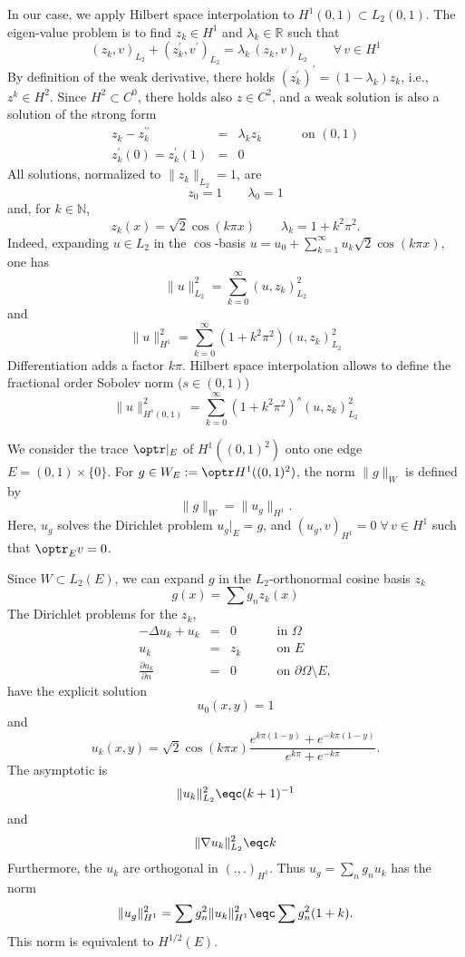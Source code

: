 In our case, we apply Hilbert space interpolation to $H^1(0,1) \subset L_2(0,1)$. The eigen-value problem is to find $z_k \in H^1$ and $\lambda_k \in {\mathbb R}$
such that
$$
(z_k, v)_{L_2} + (z_k^\prime, v^\prime)_{L_2} = \lambda_k \, 
        (z_k, v)_{L_2} \qquad \forall \, v \in H^1
$$
By definition of the weak derivative, there holds $(z_k^\prime)^\prime = (1-\lambda_k) z_k$, i.e., $z^k \in H^2$. Since $H^2 \subset C^0$, there holds also
$z \in C^2$, and a weak solution is also a solution of the strong form
\begin{equation}
\begin{array}{rcll}
z_k - z_k^{\prime \prime} & = & \lambda_k z_k \qquad & \mbox{ on } (0,1) \\
z_k^\prime(0) = z_k^\prime(1) & = & 0
\end{array}
\end{equation}
All solutions, normalized to $\| z_k \|_{L_2} = 1$, are
$$
z_0 = 1 \qquad \lambda_0 = 1
$$
and, for $k \in {\mathbb N}$,
$$
z_k(x) = \sqrt{2} \cos (k \pi x) \qquad \lambda_k = 1 + k^2 \pi^2.
$$
Indeed, expanding $u \in L_2$ in the $\cos$-basis $u = u_0 + \sum_{k=1}^\infty
u_k \sqrt2 \cos (k \pi x)$, one has
$$
\| u \|_{L_2}^2 = \sum_{k=0}^\infty (u, z_k)_{L_2}^2
$$
and
$$
\| u \|_{H^1}^2 = \sum_{k=0}^\infty (1+k^2 \pi^2) (u, z_k)_{L_2}^2
$$
Differentiation adds a factor $k \pi$.
Hilbert space interpolation allows to define the fractional order Sobolev
norm ($s \in (0,1)$)
$$
\| u \|_{H^s(0,1)}^2 = \sum_{k=0}^\infty (1+k^2 \pi^2)^s (u,z_k)_{L_2}^2
$$




\bigskip
We consider the trace $\optr|_E$ of $H^1((0,1)^2)$ onto one edge $E = (0,1) \times \{ 0 \}$. For $g \in W_E := \optr H^1((0,1)^2)$, the norm $\| g \|_W$ is 
defined by 
$$
\| g \|_W = \| u_g \|_{H^1}.
$$
Here, $u_g$ solves the Dirichlet problem $u_g|_E = g$, and $(u_g,v)_{H^1} = 0 \; \forall \, v \in H^1$ such that $\optr_E v = 0$.

Since $W \subset L_2(E)$, we can expand $g$ in the $L_2$-orthonormal cosine basis $z_k$
$$
g(x) = \sum g_n z_k(x)
$$
The Dirichlet problems for the $z_k$,
$$
\begin{array}{rcll}
-\Delta u_k + u_k & = & 0  \qquad & \mbox{in } \Omega \\
 u_k & = & z_k \qquad & \mbox{on } E \\
\frac{\partial u_k}{\partial n} & = & 0 \qquad & \mbox{on } \partial \Omega \setminus E,
\end{array}
$$
have the explicit solution
$$
u_0(x,y) = 1
$$
and
$$
u_k(x,y) = \sqrt 2 \cos (k \pi x) \frac{e^{k \pi (1-y)} + e^{-k \pi (1-y)}}{e^{k \pi} + e^{-k \pi}}.
$$
The asymptotic is
$$
\| u_k \|_{L_2}^2 \eqc (k+1)^{-1}
$$
and
$$
\| \nabla u_k \|_{L_2}^2 \eqc k 
$$
Furthermore, the $u_k$ are orthogonal in $(.,.)_{H^1}$. Thus $u_g = \sum_n g_n u_k$ has the norm
$$
\| u_g \|_{H^1}^2 = \sum g_n^2 \| u_k \|_{H^1}^2 \eqc \sum g_n^2 (1+k).
$$
This norm is equivalent to $H^{1/2}(E)$. 


